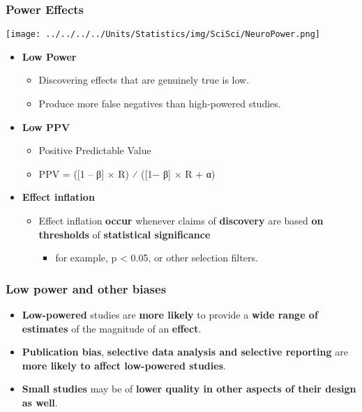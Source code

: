 \documentclass[10pt,article]{article}
\begin{document}
\subsubsection{Power Effects}
\label{sec:org03e9523}
\begin{center}
\texttt{[image: ../../../../Units/Statistics/img/SciSci/NeuroPower.png]}
\end{center}
\begin{itemize}
\item \textbf{Low Power}
\begin{itemize}
\item Discovering effects that are genuinely true is low.
\item Produce more false negatives than high-powered studies.
\end{itemize}
\item \textbf{Low PPV}
\begin{itemize}
\item Positive Predictable Value
\item PPV = ([1 – β] × R) ⁄ ([1− β] × R + α)
\end{itemize}
\item \textbf{Effect inflation}
\begin{itemize}
\item Effect inflation \textbf{occur} whenever claims of \textbf{discovery} are based \textbf{on thresholds} of \textbf{statistical significance}
\begin{itemize}
\item for example, p < 0.05, or other selection filters.
\end{itemize}
\end{itemize}
\end{itemize}

\subsubsection{Low power and other biases}
\label{sec:org5454bb5}
\begin{itemize}
\item \textbf{Low-powered} studies are \textbf{more likely} to provide a \textbf{wide range of estimates} of the magnitude of an \textbf{effect}.
\item \textbf{Publication bias}, \textbf{selective data analysis and selective reporting} are \textbf{more likely to affect low-powered studies}.
\item \textbf{Small studies} may be of \textbf{lower quality in other aspects of their design as well}.
\end{itemize}
\end{document}
